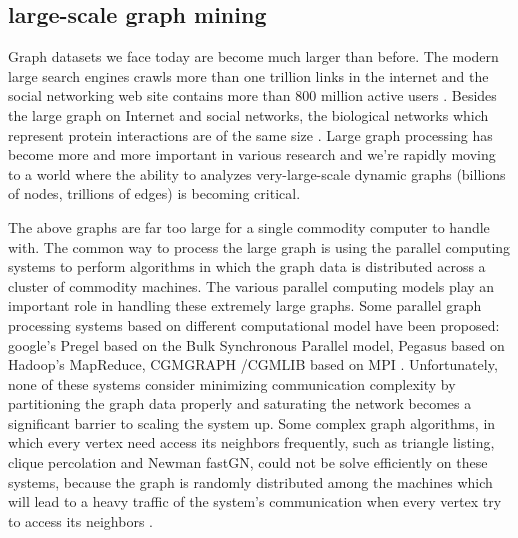 \documentclass{acm_proc_article-sp}
\begin{document}
\subsection{large-scale graph mining}
 Graph datasets we face today are become much larger than before. The modern large search engines crawls more than one trillion links in the internet and the social networking web site contains more than 800 million active users \cite{url:facebook}. Besides the large graph on Internet and social networks, the biological networks which represent protein interactions are of the same size \cite{bailly-bechet:finding}. Large graph processing has become more and more important in various research and we're rapidly moving to a world where the ability to analyzes very-large-scale dynamic graphs (billions of nodes, trillions of edges) is becoming critical.
\par
The above graphs are far too large for a single commodity computer to handle with. The common way to process the large graph is using the parallel computing systems to perform algorithms in which the graph data is distributed across a cluster of commodity machines. The various parallel computing models play an important role in handling these extremely large graphs. Some parallel graph processing systems based on different computational model have been proposed: google's Pregel based on the Bulk Synchronous Parallel model, Pegasus based on Hadoop's MapReduce, CGMGRAPH /CGMLIB based on MPI \cite{kang:pegasus,malewicz:pregel,chan:cgmlib} . Unfortunately, none of these systems consider minimizing communication complexity by partitioning the graph data properly and saturating the network becomes a significant barrier to scaling the system up. Some complex graph algorithms, in which every vertex need access its neighbors frequently, such as triangle listing, clique percolation and Newman fastGN, could not be solve efficiently on these systems, because the graph is randomly distributed among the machines which will lead to a heavy traffic of the system's communication when every vertex try to access its neighbors .
\end{document}
